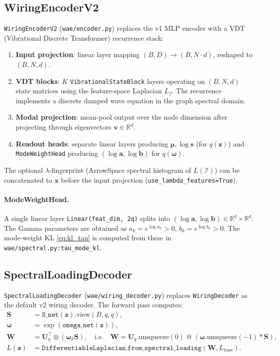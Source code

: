 \documentclass[11pt,a4paper]{article}
\newcommand{\R}{\mathbb{R}}
\newcommand{\I}{\mathcal{I}}
\newcommand{\bU}{\bm{U}}
\newcommand{\bS}{\bm{S}}
\newcommand{\bW}{\bm{W}}
\newcommand{\bz}{\bm{z}}
\newcommand{\bmu}{\bm{\mu}}
\newcommand{\bomega}{\bm{\omega}}
\newcommand{\bx}{\bm{x}}
\begin{document}
\subsection{WiringEncoderV2}
\label{sec:encoder}

\texttt{WiringEncoderV2} (\texttt{wae/encoder.py}) replaces the v1 MLP encoder
with a VDT (Vibrational Discrete Transformer) recurrence stack:
\begin{enumerate}
  \item \textbf{Input projection}: linear layer mapping $(B,D)\to(B,N{\cdot}d)$,
        reshaped to $(B,N,d)$.
  \item \textbf{VDT blocks}: $K$ \texttt{VibrationalStateBlock} layers operating
        on $(B,N,d)$ state matrices using the feature-space Laplacian $L_f$.
        The recurrence implements a discrete damped wave equation in the graph
        spectral domain.
  \item \textbf{Modal projection}: mean-pool output over the node dimension
        after projecting through eigenvectors $\bm{v}\in\R^d$.
  \item \textbf{Readout heads}: separate linear layers producing
        $\bmu,\log\bm{s}$ (for $q(\bz)$) and \texttt{ModeWeightHead}
        producing $(\log\bm{a},\log\bm{b})$ for $q(\bomega)$.
\end{enumerate}
The optional $\lambda$-fingerprint (ArrowSpace spectral histogram of $L(\I)$)
can be concatenated to $\bx$ before the input projection
(\texttt{use\_lambda\_features=True}).

\paragraph{ModeWeightHead.}
A single linear layer \texttt{Linear(feat\_dim, 2q)} splits into
$(\log\bm{a}, \log\bm{b})\in\R^q\times\R^q$.  The Gamma parameters are
obtained as $a_k = e^{\log a_k}>0$, $b_k = e^{\log b_k}>0$.
The mode-weight KL \eqref{eq:kl_tau} is computed from these in
\texttt{wae/spectral.py:tau\_mode\_kl}.

\subsection{SpectralLoadingDecoder}
\label{sec:decoder}

\texttt{SpectralLoadingDecoder} (\texttt{wae/wiring\_decoder.py}) replaces
\texttt{WiringDecoder} as the default v2 wiring decoder.  The forward pass
computes:
\begin{align}
  \bS &= \texttt{S\_net}(\bz).\text{view}(B,q,q), \label{eq:S_net}\\
  \bomega &= \exp(\texttt{omega\_net}(\bz)), \label{eq:omega_net}\\
  \bW &= \bU_q^\top \otimes (\bomega_{k}\bS),\quad
        \text{i.e.}\quad
        \bW = \bU_q.\text{unsqueeze}(0)
        \;\texttt{@}\;(\bomega.\text{unsqueeze}(-1)\ast\bS),
        \label{eq:W}\\
  L(\bz) &= \texttt{DifferentiableLaplacian.from\_spectral\_loading}(\bW, L_{\mathrm{base}}).
           \label{eq:Lz}
\end{align}
\end{document}
